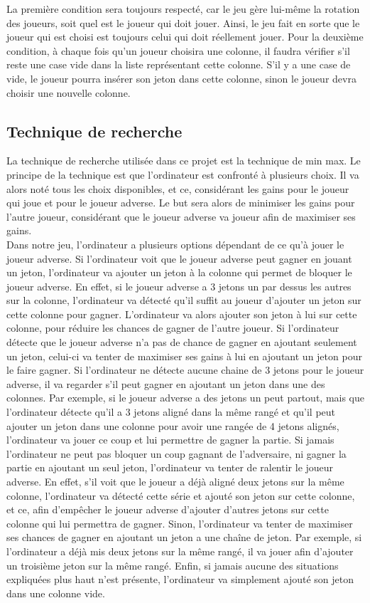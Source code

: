 \documentclass[12pt]{article}
\begin{document}
La première condition sera toujours respecté, car le jeu gère lui-même la rotation des joueurs, soit quel est le joueur qui doit jouer. Ainsi, le jeu fait en sorte que le joueur qui est choisi est toujours celui qui doit réellement jouer. Pour la deuxième condition, à chaque fois qu'un joueur choisira une colonne, il faudra vérifier s'il reste une case vide dans la liste représentant cette colonne. S'il y a une case de vide, le joueur pourra insérer son jeton dans cette colonne, sinon le joueur devra choisir une nouvelle colonne.

\subsection*{Technique de recherche}
La technique de recherche utilisée dans ce projet est la technique de min max. Le principe de la technique est que l'ordinateur est confronté à plusieurs choix. Il va alors noté tous les choix disponibles, et ce, considérant les gains pour le joueur qui joue et pour le joueur adverse. Le but sera alors de minimiser les gains pour l'autre joueur, considérant que le joueur adverse va joueur afin de maximiser ses gains. \\

Dans notre jeu, l'ordinateur a plusieurs options dépendant de ce qu'à jouer le joueur adverse. Si l'ordinateur voit que le joueur adverse peut gagner en jouant un jeton, l'ordinateur va ajouter un jeton à la colonne qui permet de bloquer le joueur adverse. En effet, si le joueur adverse a 3 jetons un par dessus les autres sur la colonne, l'ordinateur va détecté qu'il suffit au joueur d'ajouter un jeton sur cette colonne pour gagner. L'ordinateur va alors ajouter son jeton à lui sur cette colonne, pour réduire les chances de gagner de l'autre joueur. Si l'ordinateur détecte que le joueur adverse n'a pas de chance de gagner en ajoutant seulement un jeton, celui-ci va tenter de maximiser ses gains à lui en ajoutant un jeton pour le faire gagner. Si l'ordinateur ne détecte aucune chaine de 3 jetons pour le joueur adverse, il va regarder s'il peut gagner en ajoutant un jeton dans une des colonnes. Par exemple, si le joueur adverse a des jetons un peut partout, mais que l'ordinateur détecte qu'il a 3 jetons aligné dans la même rangé et qu'il peut ajouter un jeton dans une colonne pour avoir une rangée de 4 jetons alignés, l'ordinateur va jouer ce coup et lui permettre de gagner la partie. Si jamais l'ordinateur ne peut pas bloquer un coup gagnant de l'adversaire, ni gagner la partie en ajoutant un seul jeton, l'ordinateur va tenter de ralentir le joueur adverse. En effet, s'il voit que le joueur a déjà aligné deux jetons sur la même colonne, l'ordinateur va détecté cette série et ajouté son jeton sur cette colonne, et ce, afin d'empêcher le joueur adverse d'ajouter d'autres jetons sur cette colonne qui lui permettra de gagner. Sinon, l'ordinateur va tenter de maximiser ses chances de gagner en ajoutant un jeton a une chaîne de jeton. Par exemple, si l'ordinateur a déjà mis deux jetons sur la même rangé, il va jouer afin d'ajouter un troisième jeton sur la même rangé. Enfin, si jamais aucune des situations expliquées plus haut n'est présente, l'ordinateur va simplement ajouté son jeton dans une colonne vide. \\
\end{document}
